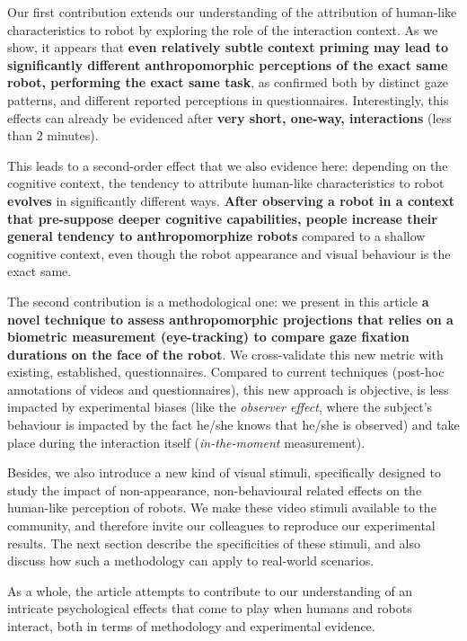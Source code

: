\documentclass[lettersize, noapacite, twoside, HRI]{apa_HRI}
\begin{document}
Our first contribution extends our understanding of the attribution of
human-like characteristics to robot by exploring the role of the interaction
context. As we show, it appears that \textbf{even relatively subtle context
priming may lead to significantly different anthropomorphic perceptions of
the exact same robot, performing the exact same task}, as confirmed both by
distinct gaze patterns, and different reported perceptions in questionnaires.
Interestingly, this effects can already be evidenced after \textbf{very short,
one-way, interactions} (less than 2 minutes).

This leads to a second-order effect that we also evidence here: depending on the
cognitive context, the tendency to attribute human-like characteristics to robot
\textbf{evolves} in significantly different ways. \textbf{After observing a robot in a
context that pre-suppose deeper cognitive capabilities, people increase
their general tendency to anthropomorphize robots} compared to a shallow
cognitive context, even though the robot appearance and visual behaviour is the
exact same.

The second contribution is a methodological one: we present in this article
\textbf{a novel technique to assess anthropomorphic projections that relies on a
biometric measurement (eye-tracking) to compare gaze fixation durations on
the face of the robot}. We cross-validate this new metric with existing,
established, questionnaires. Compared to current techniques (post-hoc
annotations of videos and questionnaires), this new approach is objective,
is less impacted by experimental biases (like the \emph{observer effect},
where the subject's behaviour is impacted by the fact he/she knows that
he/she is observed) and take place during the interaction itself
(\emph{in-the-moment} measurement).

Besides, we also introduce a new kind of visual stimuli, specifically designed
to study the impact of non-appearance, non-behavioural related effects on the
human-like perception of robots. We make these video stimuli available to the
community, and therefore invite our colleagues to reproduce our experimental
results. The next section describe the specificities of these stimuli, and also
discuss how such a methodology can apply to real-world scenarios.

As a whole, the article attempts to contribute to our understanding of an
intricate psychological effects that come to play when humans and robots
interact, both in terms of methodology and experimental evidence.
\end{document}
